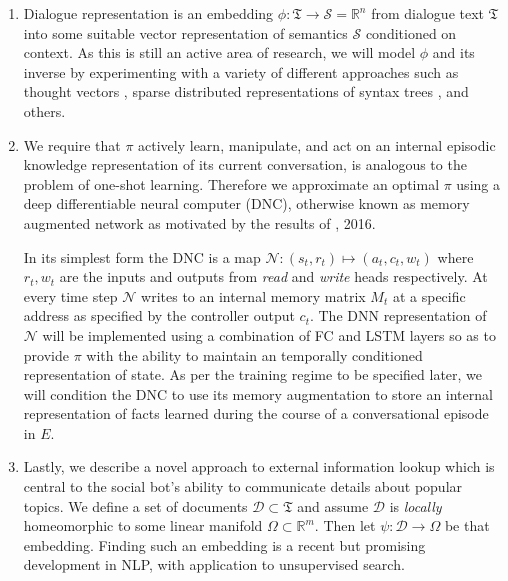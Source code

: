 \documentclass{article} %
\theoremstyle{named}
\def\scriptd{{\mathcal D}}
\def\scriptn{{\mathcal N}}
\def\scripts{{\mathcal S}}
\begin{document}
\begin{enumerate}
\item Dialogue representation is an embedding $ \phi: \mathfrak{T} \to \scripts = \mathbb{R}^n $ from dialogue text $\mathfrak{T}$ into some suitable vector representation of semantics $\scripts$ conditioned on context. As this is still an active area of research, we will model $ \phi $ and its inverse by experimenting with a variety of different approaches such as thought vectors \cite{NIPS2015_5950}, sparse distributed representations of syntax trees \cite{DBLP:journals/corr/YogatamaFDS14}, and others.

\item We require that $ \pi $ actively learn, manipulate, and act on an internal episodic knowledge representation of its current conversation, is analogous to the problem of one-shot learning. Therefore we approximate an optimal $ \pi $ using a deep differentiable neural computer (DNC)\cite{DBLP:journals/corr/GravesWD14}\cite{graves2016hybrid}, otherwise known as memory augmented network as motivated by the results of \citeauthor{DBLP:journals/corr/SantoroBBWL16}, 2016.

In its simplest form the DNC is a map $ \scriptn: (s_t, r_t) \mapsto (a_t, c_t, w_t) $ where  $ r_t, w_t $ are the inputs and outputs from \emph{read} and \emph{write} heads respectively. At every time step $\scriptn$ writes to an internal memory matrix $M_t$ at a specific address as specified by the controller output $c_t$. The DNN representation of $\scriptn$ will be implemented using a combination of FC and LSTM layers so as to provide $\pi$ with the ability to maintain an temporally conditioned representation of state. As per the training regime to be specified later, we will condition the DNC to use its memory augmentation to store an internal representation of facts learned during the course of a conversational episode in $E$.

\item Lastly, we describe a novel approach to external information lookup which is central to the social bot's ability to communicate details about popular topics. We define a set of documents $ \scriptd \subset \mathfrak{T} $ and assume $ \scriptd $ is \emph{locally} homeomorphic to some linear manifold $\Omega \subset \mathbb{R}^m$. Then let $\psi: \scriptd \to \Omega$ be that embedding. Finding such an embedding is a recent but promising development in NLP, with application to unsupervised search\cite{DBLP:journals/corr/DaiOL15}.


\end{enumerate}
\end{document}
